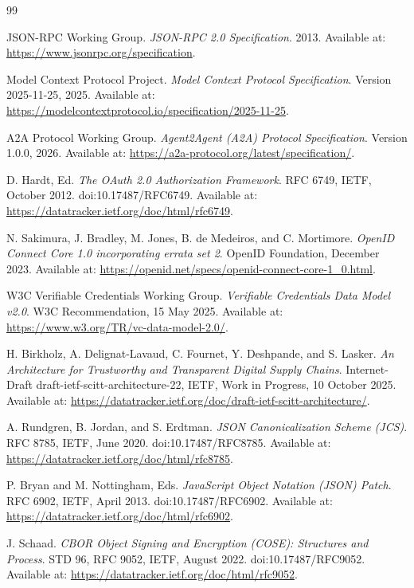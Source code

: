 \documentclass[11pt]{article}
\begin{document}
\begin{thebibliography}{99}

JSON-RPC Working Group. \emph{JSON-RPC 2.0 Specification}. 2013. Available at: \url{https://www.jsonrpc.org/specification}.

Model Context Protocol Project. \emph{Model Context Protocol Specification}. Version 2025-11-25, 2025. Available at: \url{https://modelcontextprotocol.io/specification/2025-11-25}.

A2A Protocol Working Group. \emph{Agent2Agent (A2A) Protocol Specification}. Version 1.0.0, 2026. Available at: \url{https://a2a-protocol.org/latest/specification/}.

D. Hardt, Ed. \emph{The OAuth 2.0 Authorization Framework}. RFC 6749, IETF, October 2012. doi:10.17487/RFC6749. Available at: \url{https://datatracker.ietf.org/doc/html/rfc6749}.

N. Sakimura, J. Bradley, M. Jones, B. de Medeiros, and C. Mortimore. \emph{OpenID Connect Core 1.0 incorporating errata set 2}. OpenID Foundation, December 2023. Available at: \url{https://openid.net/specs/openid-connect-core-1_0.html}.

W3C Verifiable Credentials Working Group. \emph{Verifiable Credentials Data Model v2.0}. W3C Recommendation, 15 May 2025. Available at: \url{https://www.w3.org/TR/vc-data-model-2.0/}.

H. Birkholz, A. Delignat-Lavaud, C. Fournet, Y. Deshpande, and S. Lasker. \emph{An Architecture for Trustworthy and Transparent Digital Supply Chains}. Internet-Draft draft-ietf-scitt-architecture-22, IETF, Work in Progress, 10 October 2025. Available at: \url{https://datatracker.ietf.org/doc/draft-ietf-scitt-architecture/}.

A. Rundgren, B. Jordan, and S. Erdtman. \emph{JSON Canonicalization Scheme (JCS)}. RFC 8785, IETF, June 2020. doi:10.17487/RFC8785. Available at: \url{https://datatracker.ietf.org/doc/html/rfc8785}.

P. Bryan and M. Nottingham, Eds. \emph{JavaScript Object Notation (JSON) Patch}. RFC 6902, IETF, April 2013. doi:10.17487/RFC6902. Available at: \url{https://datatracker.ietf.org/doc/html/rfc6902}.

J. Schaad. \emph{CBOR Object Signing and Encryption (COSE): Structures and Process}. STD 96, RFC 9052, IETF, August 2022. doi:10.17487/RFC9052. Available at: \url{https://datatracker.ietf.org/doc/html/rfc9052}.


\end{thebibliography}
\end{document}

